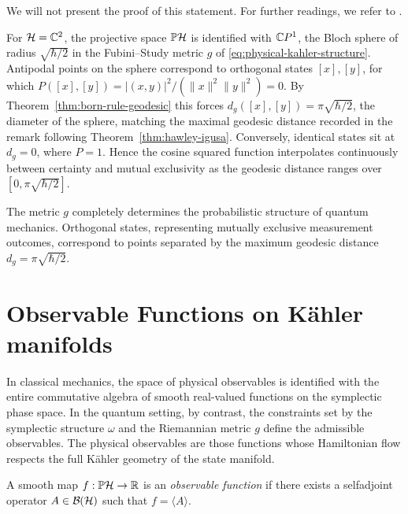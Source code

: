 \noindent We will not present the proof of this statement. For further readings, we refer to  \cite[Theorem II.2]{ashtekarGeometricalFormulationQuantum1997}.

\begin{example}[Qubit]
	For $\H=\C^2$, the projective space $\PH$ is identified with $\mathbb{C} P^1$, the Bloch sphere of radius $\sqrt{\hbar/2}$ in the Fubini--Study metric $g$ of \eqref{eq:physical-kahler-structure}. Antipodal points on the sphere correspond to orthogonal states $[x],[y]$, for which $P([x],[y])=|(x,y)|^2/(\|x\|^2\|y\|^2)=0$. By Theorem~\ref{thm:born-rule-geodesic} this forces
	$d_g([x],[y])=\pi\sqrt{\hbar/2}$, the diameter of the sphere, matching
	the maximal geodesic distance recorded in the remark following
	Theorem~\ref{thm:hawley-igusa}. Conversely, identical states sit at
	$d_g=0$, where $P=1$. Hence the cosine squared function interpolates continuously between
	certainty and mutual exclusivity as the geodesic distance ranges over
	$[0,\pi\sqrt{\hbar/2}]$.
\end{example}

\begin{remark}
	The metric $g$ completely determines the probabilistic structure of quantum mechanics. Orthogonal states, representing mutually exclusive measurement outcomes, correspond to points separated by the maximum geodesic distance $d_g = \pi \sqrt{\hbar/2}$.
\end{remark}

\section{Observable Functions on Kähler manifolds}
\label{sec:observables}

In classical mechanics, the space of physical observables is identified with the entire commutative algebra of smooth real-valued functions on the symplectic phase space. In the quantum setting, by contrast, the constraints set by the symplectic structure $\omega$ and the Riemannian metric $g$ define the admissible observables. The physical observables are those functions whose Hamiltonian flow respects the full Kähler geometry of the state manifold.

\begin{definition}
	\label{def:observable-function}
	A smooth map $f:\PH\to\R$ is an \emph{observable function} if there exists a selfadjoint operator $A\in\BH$ such that $f = \langle A\rangle$.
\end{definition}

